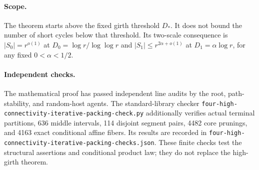 \paragraph{Scope.}
The theorem starts above the fixed girth threshold $D_*$.
It does not bound the number of short cycles below that threshold.
Its two-scale consequence is $|S_0|=r^{o(1)}$ at $D_0=\log r/\log\log r$ and $|S_1|\le r^{2\alpha+o(1)}$ at $D_1=\alpha\log r$, for any fixed $0<\alpha<1/2$.

\paragraph{Independent checks.}
The mathematical proof has passed independent line audits by the root, path-stability, and random-host agents.
The standard-library checker \texttt{four-high-connectivity-iterative-packing-check.py} additionally verifies actual terminal partitions, 636 middle intervals, 114 disjoint segment pairs, 4482 core prunings, and 4163 exact conditional affine fibers.
Its results are recorded in \texttt{four-high-connectivity-iterative-packing-checks.json}.
These finite checks test the structural assertions and conditional product law; they do not replace the high-girth theorem.
